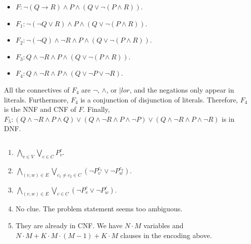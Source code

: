 \begin{exer}[1.5]
\begin{enumerate}[label=(\alph*)]
            $ $
            \begin{itemize}
                \item
                    $F: \neg(Q \rightarrow R) \land P \land (Q \lor \neg(P \land R))$.
                \item
                    $F_1: \neg(\neg Q \lor R) \land P \land (Q \lor \neg(P \land R))$.
                \item
                    $F_2: \neg(\neg Q) \land \neg R \land P \land (Q \lor \neg(P \land R))$.
                \item
                    $F_3: Q \land \neg R \land P \land (Q \lor \neg(P \land R))$.
                \item
                    $F_4: Q \land \neg R \land P \land (Q \lor \neg P \lor \neg R)$.
            \end{itemize}
            All the connectives of $F_4$ are $\neg$, $\land$, or $|lor$, and the negations only appear in literals.
            Furthermore, $F_4$ is a conjunction of disjunction of literals.
            Therefore, $F_4$ is the NNF and CNF of $F$.
            Finally, $F_5: (Q \land \neg R \land P \land Q) \lor (Q \land \neg R \land P \land \neg P) \lor (Q \land \neg R \land P \land \neg R)$ is in DNF.
    \end{enumerate}
\end{exer}

\begin{exer}[1.6]
    $ $
    \begin{enumerate}[label=(\alph*)]
        \item
            $\bigwedge\limits_{v \in V} \bigvee\limits_{c \in C} P^c_v$.
        \item
            $\bigwedge\limits_{(v, w) \in E} \bigvee\limits_{c_1 \ne c_2 \in C} (\neg P_v^{c_1} \vee \neg P^{c_2}_w)$.
        \item
            $\bigwedge\limits_{(v, w) \in E} \bigvee\limits_{c \in C} (\neg P_v^c \vee \neg P^c_w)$.
        \item
            No clue.
            The problem statement seems too ambiguous.
        \item
            They are already in CNF.
            We have $N \cdot M$ variables and $N \cdot M + K \cdot M \cdot (M - 1) + K \cdot M$ clauses in the encoding above.
    \end{enumerate}
\end{exer}


